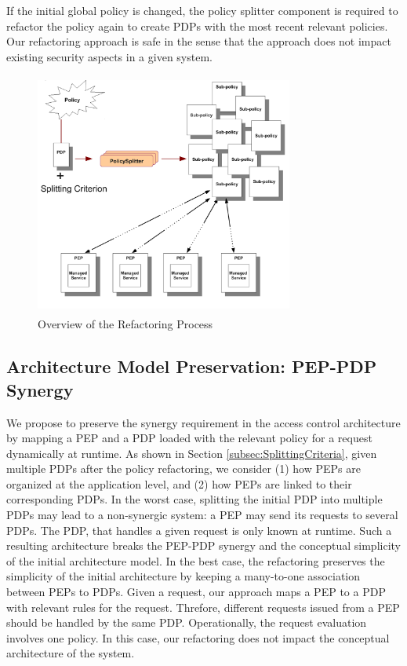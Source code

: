 If the initial global policy is changed, the policy splitter component is required to refactor the policy again to create PDPs with the most recent relevant policies. Our refactoring approach is safe 
in the sense that the approach does not impact existing security aspects in a given system. 
\begin{figure}[!h]
\begin{center}
\includegraphics[width=8.5cm, height=8cm]{Overall-process}
\caption{Overview of the Refactoring Process}
\label{overallprocess}
\end{center}
\end{figure}
\subsection{Architecture Model Preservation: PEP-PDP Synergy}
We propose to preserve the synergy requirement in the access control architecture by mapping a PEP and a PDP loaded
with the relevant policy for a request dynamically at runtime. As shown in Section \ref{subsec:SplittingCriteria}, given multiple PDPs after the policy refactoring, we consider 
(1) how PEPs are organized at the application level, and (2) how PEPs are linked to their corresponding PDPs.
In the worst case, splitting the initial PDP into multiple PDPs may lead to a non-synergic system: a PEP may send its requests to several PDPs. 
The PDP, that handles a given request is only known at runtime. Such a resulting architecture breaks the PEP-PDP synergy and the conceptual 
simplicity of the initial architecture model. 
In the best case, the refactoring preserves the simplicity of the initial architecture by keeping a many-to-one association 
between PEPs to PDPs. Given a request, our approach maps a PEP to a PDP with relevant rules for the request.
Threfore, different requests issued from a PEP should be handled by the same PDP. Operationally, the request evaluation involves 
one policy. In this case, our refactoring does not impact the conceptual architecture of the system.

